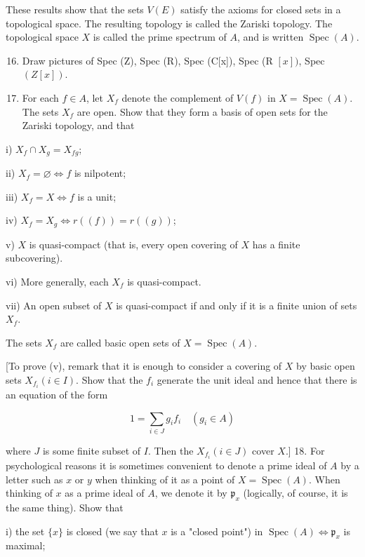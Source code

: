 \documentclass{standalone}
\theoremstyle{definition}
\theoremstyle{remark}
\begin{document}
These results show that the sets $V(E)$ satisfy the axioms for closed sets in a topological space. The resulting topology is called the Zariski topology. The topological space $X$ is called the prime spectrum of $A$, and is written $\operatorname{Spec}(A)$.

\begin{enumerate}
  \setcounter{enumi}{15}
  \item Draw pictures of Spec (Z), Spec (R), Spec (C[x]), Spec (R $[x])$, Spec $(Z[x])$.

  \item For each $f \in A$, let $X_{f}$ denote the complement of $V(f)$ in $X=\operatorname{Spec}(A)$. The sets $X_{f}$ are open. Show that they form a basis of open sets for the Zariski topology, and that

\end{enumerate}

i) $X_{f} \cap X_{g}=X_{f g}$;

ii) $X_{f}=\varnothing \Leftrightarrow f$ is nilpotent;

iii) $X_{f}=X \Leftrightarrow f$ is a unit;

iv) $X_{f}=X_{g} \Leftrightarrow r((f))=r((g))$;

v) $X$ is quasi-compact (that is, every open covering of $X$ has a finite subcovering).

vi) More generally, each $X_{f}$ is quasi-compact.

vii) An open subset of $X$ is quasi-compact if and only if it is a finite union of sets $X_{f}$.

The sets $X_{f}$ are called basic open sets of $X=\operatorname{Spec}(A)$.

[To prove (v), remark that it is enough to consider a covering of $X$ by basic open sets $X_{f_{i}}(i \in I)$. Show that the $f_{i}$ generate the unit ideal and hence that there is an equation of the form

\[
1=\sum_{i \in J} g_{i} f_{i} \quad\left(g_{i} \in A\right)
\]

where $J$ is some finite subset of $I$. Then the $X_{f_{i}}(i \in J)$ cover $X$.] 18. For psychological reasons it is sometimes convenient to denote a prime ideal of $A$ by a letter such as $x$ or $y$ when thinking of it as a point of $X=\operatorname{Spec}(A)$. When thinking of $x$ as a prime ideal of $A$, we denote it by $\mathfrak{p}_{x}$ (logically, of course, it is the same thing). Show that

i) the set $\{x\}$ is closed (we say that $x$ is a "closed point") in $\operatorname{Spec}(A) \Leftrightarrow \mathfrak{p}_{x}$ is maximal;
\end{document}

